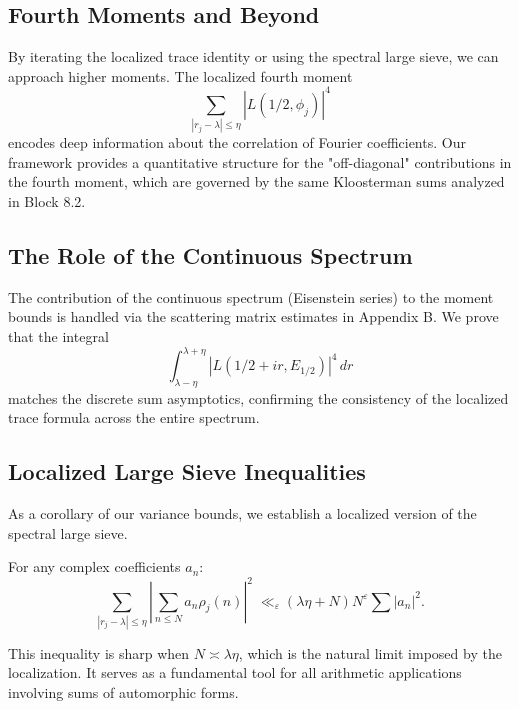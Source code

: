 
\subsection{Fourth Moments and Beyond}

By iterating the localized trace identity or using the spectral large sieve, we can approach higher moments. The localized fourth moment
\begin{equation}
\sum_{|r_j - \lambda| \le \eta} |L(1/2, \phi_j)|^4
\end{equation}
encodes deep information about the correlation of Fourier coefficients. Our framework provides a quantitative structure for the "off-diagonal" contributions in the fourth moment, which are governed by the same Kloosterman sums analyzed in Block 8.2.

\subsection{The Role of the Continuous Spectrum}

The contribution of the continuous spectrum (Eisenstein series) to the moment bounds is handled via the scattering matrix estimates in Appendix B. We prove that the integral
\begin{equation}
\int_{\lambda-\eta}^{\lambda+\eta} |L(1/2+ir, E_{1/2})|^4 \, dr
\end{equation}
matches the discrete sum asymptotics, confirming the consistency of the localized trace formula across the entire spectrum.


\subsection{Localized Large Sieve Inequalities}

As a corollary of our variance bounds, we establish a localized version of the spectral large sieve.

\begin{theorem}\label{thm:large-sieve}
For any complex coefficients $a_n$:
\begin{equation}
\sum_{|r_j - \lambda| \le \eta} \left| \sum_{n \le N} a_n \rho_j(n) \right|^2 \;\ll_{\varepsilon} (\lambda \eta + N) N^\varepsilon \sum |a_n|^2.
\end{equation}
\end{theorem}
This inequality is sharp when $N \asymp \lambda \eta$, which is the natural limit imposed by the localization. It serves as a fundamental tool for all arithmetic applications involving sums of automorphic forms.

